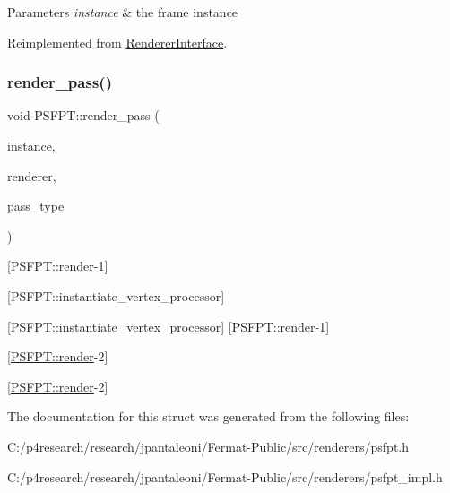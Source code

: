 \begin{DoxyParams}{Parameters}
{\em instance} & the frame instance \\
\hline
\end{DoxyParams}


Reimplemented from \hyperlink{struct_renderer_interface_aa64254dd44c94929b05092dc8d74f29d}{Renderer\+Interface}.

\mbox{\label{struct_p_s_f_p_t_a1abf10b172530da4aab53a4d70b745d8}} 
\subsubsection{\texorpdfstring{render\+\_\+pass()}{render\_pass()}}
{\footnotesize\ttfamily void P\+S\+F\+P\+T\+::render\+\_\+pass (\begin{DoxyParamCaption}\item[{const uint32}]{instance,  }\item[{\hyperlink{struct_rendering_context}{Rendering\+Context} \&}]{renderer,  }\item[{const Pass\+Type}]{pass\+\_\+type }\end{DoxyParamCaption})}

\mbox{[}\hyperlink{struct_p_s_f_p_t_aac923cb36f8f1d8ad27f01becef44fd9}{P\+S\+F\+P\+T\+::render}-\/1\mbox{]}

\mbox{[}P\+S\+F\+P\+T\+::instantiate\+\_\+vertex\+\_\+processor\mbox{]}

\mbox{[}P\+S\+F\+P\+T\+::instantiate\+\_\+vertex\+\_\+processor\mbox{]} \mbox{[}\hyperlink{struct_p_s_f_p_t_aac923cb36f8f1d8ad27f01becef44fd9}{P\+S\+F\+P\+T\+::render}-\/1\mbox{]}

\mbox{[}\hyperlink{struct_p_s_f_p_t_aac923cb36f8f1d8ad27f01becef44fd9}{P\+S\+F\+P\+T\+::render}-\/2\mbox{]}

\mbox{[}\hyperlink{struct_p_s_f_p_t_aac923cb36f8f1d8ad27f01becef44fd9}{P\+S\+F\+P\+T\+::render}-\/2\mbox{]} 

The documentation for this struct was generated from the following files\+:\begin{DoxyCompactItemize}
\item 
C\+:/p4research/research/jpantaleoni/\+Fermat-\/\+Public/src/renderers/psfpt.\+h\item 
C\+:/p4research/research/jpantaleoni/\+Fermat-\/\+Public/src/renderers/psfpt\+\_\+impl.\+h\end{DoxyCompactItemize}
